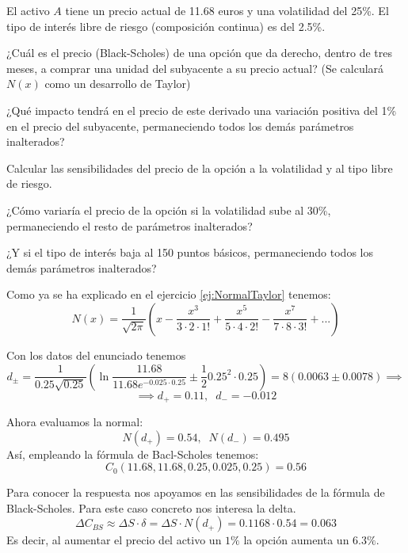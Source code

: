 \begin{problem}[3]
El activo $A$ tiene un precio actual de 11.68 euros y una volatilidad del 25\%. El tipo de interés libre de riesgo (composición continua) es del 2.5\%.

\ppart ¿Cuál es el precio (Black-Scholes) de una opción que da derecho, dentro de tres meses, a comprar una unidad del subyacente a su precio actual? (Se calculará $N(x)$ como un desarrollo de Taylor)

\ppart ¿Qué impacto tendrá en el precio de este derivado una variación positiva del 1\% en el precio del subyacente, permaneciendo todos los demás parámetros inalterados?

\ppart Calcular las sensibilidades del precio de la opción a la volatilidad y al tipo libre de riesgo.

\ppart ¿Cómo variaría el precio de la opción si la volatilidad sube al 30\%, permaneciendo el resto de parámetros inalterados?

\ppart ¿Y si el tipo de interés baja al 150 puntos básicos, permaneciendo todos los demás parámetros inalterados?

\solution


\spart

Como ya se ha explicado en el ejercicio \ref{ej:NormalTaylor} tenemos:
\[N(x) = \frac{1}{\sqrt{2π}}\left(x-\frac{x^3}{3 \cdot 2 \cdot 1!} +\frac{x^5}{5 \cdot 4 \cdot 2!} - \frac{x^7}{7\cdot 8 \cdot 3!}+...\right)\]

Con los datos del enunciado tenemos
\[d_{\pm} = \frac{1}{0.25\sqrt{0.25}}\left(\ln \frac{11.68}{11.68e^{-0.025\cdot 0.25}}\pm\frac{1}{2}0.25^2 \cdot 0.25\right)=8 \left(0.0063 \pm 0.0078\right) \implies\]
\[\implies d_+ = 0.11, \;\; d_-=-0.012 \]

Ahora evaluamos la normal:
\[N(d_+)=0.54, \;\; N(d_-)=0.495\]
Así, empleando la fórmula de Bacl-Scholes tenemos:
\[C_0(11.68,11.68,0.25,0.025,0.25)=0.56\]

\spart

Para conocer la respuesta nos apoyamos en las sensibilidades de la fórmula de Black-Scholes. Para este caso concreto nos interesa la delta.
\[ΔC_{BS} \approx ΔS\cdot δ = ΔS \cdot N(d_+) = 0.1168 \cdot 0.54 = 0.063\]
Es decir, al aumentar el precio del activo un $1\%$ la opción aumenta un $6.3\%$.
\end{problem}

